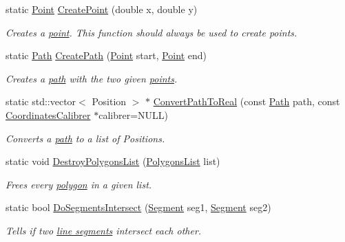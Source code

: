 \begin{DoxyCompactItemize}
\item 
static \hyperlink{structPathFinder_1_1Point}{Point} \hyperlink{classPathFinder_a457592f3579bbe0c0527360c2c8a928a}{CreatePoint} (double x, double y)
\begin{DoxyCompactList}\small\item\em Creates a \hyperlink{structPathFinder_1_1Point}{point}. This function should always be used to create points. \item\end{DoxyCompactList}\item 
static \hyperlink{classPathFinder_a269aba09b7b3208092f67f2bc02cf63e}{Path} \hyperlink{classPathFinder_a42e557e3fe4cd1b209a4722ecfbf876b}{CreatePath} (\hyperlink{structPathFinder_1_1Point}{Point} start, \hyperlink{structPathFinder_1_1Point}{Point} end)
\begin{DoxyCompactList}\small\item\em Creates a \hyperlink{classPathFinder_a269aba09b7b3208092f67f2bc02cf63e}{path} with the two given \hyperlink{structPathFinder_1_1Point}{points}. \item\end{DoxyCompactList}\item 
static std::vector$<$ Position $>$ $\ast$ \hyperlink{classPathFinder_aba7f833c9bb8de011c62a1f01fb26144}{ConvertPathToReal} (const \hyperlink{classPathFinder_a269aba09b7b3208092f67f2bc02cf63e}{Path} path, const \hyperlink{classCoordinatesCalibrer}{CoordinatesCalibrer} $\ast$calibrer=NULL)
\begin{DoxyCompactList}\small\item\em Converts a \hyperlink{classPathFinder_a269aba09b7b3208092f67f2bc02cf63e}{path} to a list of Positions. \item\end{DoxyCompactList}\item 
static void \hyperlink{classPathFinder_a3306e3d1bb0ae88e236eb7cabbfce835}{DestroyPolygonsList} (\hyperlink{classPathFinder_a16ed073fa542c82fd09e582cb4fbed24}{PolygonsList} list)
\begin{DoxyCompactList}\small\item\em Frees every \hyperlink{structPathFinder_1_1ConvexPolygon}{polygon} in a given list. \item\end{DoxyCompactList}\item 
static bool \hyperlink{classPathFinder_a87a4f6d236e4b386e8b727e465f802be}{DoSegmentsIntersect} (\hyperlink{structPathFinder_1_1Segment}{Segment} seg1, \hyperlink{structPathFinder_1_1Segment}{Segment} seg2)
\begin{DoxyCompactList}\small\item\em Tells if two \hyperlink{structPathFinder_1_1Segment}{line segments} intersect each other. \item\end{DoxyCompactList}\end{DoxyCompactItemize}
